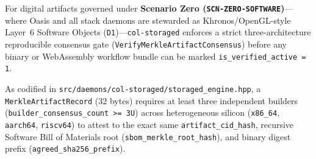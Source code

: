 For digital artifacts governed under \textbf{Scenario Zero (\texttt{SCN-ZERO-SOFTWARE})}---where Oasis and all stack daemons are stewarded as Khronos/OpenGL-style Layer~6 Software Objects (\texttt{D1})---\texttt{col-storaged} enforces a strict three-architecture reproducible consensus gate (\texttt{VerifyMerkleArtifactConsensus}) before any binary or WebAssembly workflow bundle can be marked \texttt{is\_verified\_active = 1}.

As codified in \texttt{src/daemons/col-storaged/storaged\_engine.hpp}, a \texttt{MerkleArtifactRecord} (32 bytes) requires at least three independent builders (\texttt{builder\_consensus\_count >= 3U}) across heterogeneous silicon (\texttt{x86\_64}, \texttt{aarch64}, \texttt{riscv64}) to attest to the exact same \texttt{artifact\_cid\_hash}, recursive Software Bill of Materials root (\texttt{sbom\_merkle\_root\_hash}), and binary digest prefix (\texttt{agreed\_sha256\_prefix}).

